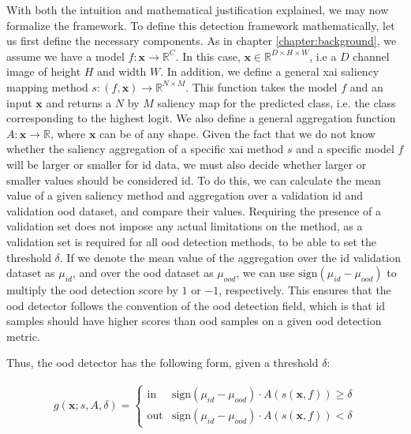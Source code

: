 \documentclass[UKenglish]{uiomasterthesis} %
\newcommand{\R}{\mathbb{R}}
\theoremstyle{definition}
\begin{document}
With both the intuition and mathematical justification explained, we may now formalize the framework. To define this detection framework mathematically, let us first define the necessary components. As in chapter \ref{chapter:background}, we assume we have a model $f: \bm{x} \to \R^C$. In this case, $\bm{x} \in \R^{D \times H \times W}$, i.e a $D$ channel image of height $H$ and width $W$. In addition, we define a general \ac{xai} saliency mapping method $s: (f, \bm{x}) \to \R^{N \times M}$. This function takes the model $f$ and an input $\bm{x}$ and returns a $N$ by $M$ saliency map for the predicted class, i.e. the class corresponding to the highest logit. We also define a general aggregation function $A: \bm{x} \rightarrow \R$, where $\bm{x}$ can be of any shape. Given the fact that we do not know whether the saliency aggregation of a specific \ac{xai} method $s$ and a specific model $f$ will be larger or smaller for \ac{id} data, we must also decide whether larger or smaller values should be considered \ac{id}. To do this, we can calculate the mean value of a given saliency method and aggregation over a validation \ac{id} and validation \ac{ood} dataset, and compare their values. Requiring the presence of a validation set does not impose any actual limitations on the method, as a validation set is required for all \ac{ood} detection methods, to be able to set the threshold $\delta$. If we denote the mean value of the aggregation over the \ac{id} validation dataset as $\mu_{id}$, and over the \ac{ood} dataset as $\mu_{ood}$, we can use $\text{sign}(\mu_{id} - \mu_{ood})$ to multiply the \ac{ood} detection score by $1$ or $-1$, respectively. This ensures that the \ac{ood} detector follows the convention of the \ac{ood} detection field, which is that \ac{id} samples should have higher scores than \ac{ood} samples on a given \ac{ood} detection metric.

Thus, the \ac{ood} detector has the following form, given a threshold $\delta$:

\begin{align}
    g(\bm{x}; s, A, \delta)=\begin{cases} 
        \text{in } & \text{sign}(\mu_{id} - \mu_{ood}) \cdot A(s(\bm{x}, f)) \ge \delta \\
        \text{out} & \text{sign}(\mu_{id} - \mu_{ood}) \cdot A(s(\bm{x}, f)) < \delta 
   \end{cases}
\label{eq:aggregate}
\end{align}
\end{document}
